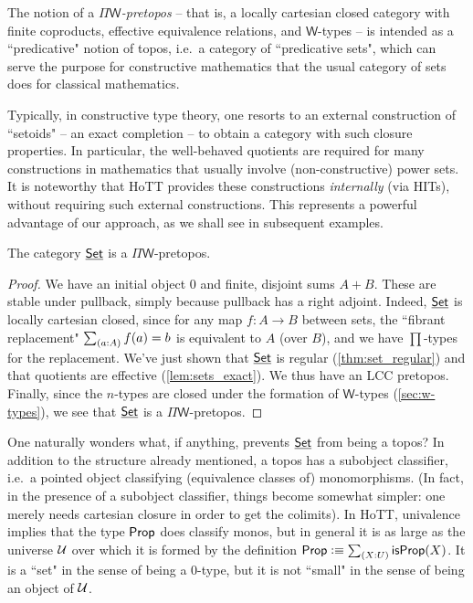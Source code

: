 The notion of a \emph{$\Pi\mathsf{W}$-pretopos} -- that is, a locally cartesian closed category with finite coproducts, effective equivalence relations, and $\mathsf{W}$-types -- is intended as a ``predicative" notion of topos, i.e.\ a category of ``predicative sets", which can serve the purpose for constructive mathematics that the usual category of sets does for classical mathematics.  

Typically, in constructive type theory, one resorts to an external construction of ``setoids" -- an exact completion -- to obtain a category with such closure properties.  In particular, the well-behaved quotients are required for many constructions in mathematics that usually involve (non-constructive) power sets.  It is noteworthy that HoTT  provides these constructions \emph{internally} (via HITs), without requiring such external constructions.  This represents a powerful advantage of our approach, as we shall see in subsequent examples.

\begin{thm} The category $\underline{\mathsf{Set}}$ is a $\Pi\mathsf{W}$-pretopos.
\end{thm}
\begin{proof}
We have an initial object $0$ and finite, disjoint sums $A+B$.  These are stable under pullback, simply because pullback has a right adjoint.  Indeed, $\underline{\mathsf{Set}}$ is locally cartesian closed, since for any map $f:A\to B$ between sets, the ``fibrant replacement" $\sm{a:A}f(a)=b$ is equivalent to $A$ (over $B$), and we have $\prod$-types for the replacement.
We've just shown that $\underline{\mathsf{Set}}$ is regular (\autoref{thm:set_regular}) and that quotients are effective (\autoref{lem:sets_exact}). We thus have an LCC pretopos. Finally, since the $n$-types are closed under the formation of $\mathsf{W}$-types
(\autoref{sec:w-types}), we see that $\underline{\mathsf{Set}}$ is a $\Pi\mathsf{W}$-pretopos. 
\end{proof}

One naturally wonders what, if anything, prevents $\underline{\mathsf{Set}}$ from being a topos? In addition to the structure already mentioned, a topos has a subobject classifier, i.e.\ a pointed object classifying (equivalence classes of) monomorphisms.  (In fact, in the presence of a subobject classifier, things become somewhat simpler: one merely needs cartesian closure in order to get the colimits).  In HoTT,  univalence implies that the type $\mathsf{Prop}$ does classify monos, but in general it is as large as the universe $\mathcal{U}$ over which it is formed by the definition $\prop \defeq \sm{X:U}\isprop(X)$. It is a ``set" in the sense of being a $0$-type, but it is not ``small" in the sense of being an object of $\mathcal{U}$.

